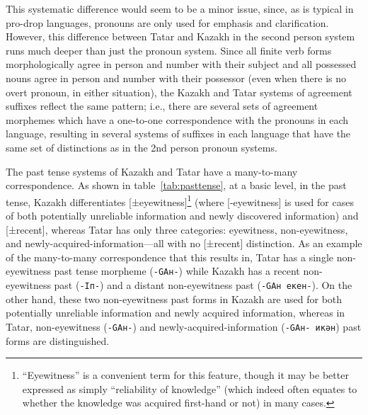 \documentclass[11pt]{article}
\begin{document}
This systematic difference would seem to be a minor issue, since, as is typical in pro-drop languages, pronouns are only used for emphasis and clarification.  However, this difference between Tatar and Kazakh in the second person system runs much deeper than just the pronoun system.  Since all finite verb forms morphologically agree in person and number with their subject and all possessed nouns agree in person and number with their possessor (even when there is no overt pronoun, in either situation), the Kazakh and Tatar systems of agreement suffixes reflect the same pattern; i.e., there are several sets of agreement morphemes which have a one-to-one correspondence with the pronouns in each language, resulting in several systems of suffixes in each language that have the same set of distinctions as in the 2nd person pronoun systems.

The past tense systems of Kazakh and Tatar have a many-to-many correspondence.  As shown in table~\ref{tab:pasttense}, at a basic level, in the past tense, Kazakh differentiates [±eyewitness]\footnote{``Eyewitness'' is a convenient term for this feature, though it may be better expressed as simply ``reliability of knowledge'' (which indeed often equates to whether the knowledge was acquired first-hand or not) in many cases.} (where [-eyewitness] is used for cases of both potentially unreliable information and newly discovered information) and [±recent], whereas Tatar has only three categories: eyewitness, non-eyewitness, and newly-acquired-information---all with no [±recent] distinction.  As an example of the many-to-many correspondence that this results in, Tatar has a single non-eyewitness past tense morpheme (\texttt{-GAн-}) while Kazakh has a recent non-eyewitness past (\texttt{-Iп-}) and a distant non-eyewitness past (\texttt{-GAн екен-}).  On the other hand, these two non-eyewitness past forms in Kazakh are used for both potentially unreliable information and newly acquired information, whereas in Tatar, non-eyewitness (\texttt{-GAн-}) and newly-acquired-information (\texttt{-GAн- икән}) past forms are distinguished.
\end{document}
